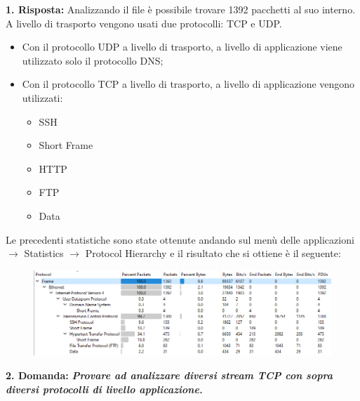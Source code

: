 \documentclass[a4paper]{article}
\begin{document}
	\noindent
	\textcolor{Green4}{\textbf{1. Risposta:}} Analizzando il file è possibile trovare 1392 pacchetti al suo interno. A livello di trasporto vengono usati due protocolli: TCP e UDP.
	\begin{itemize}
		\item Con il protocollo UDP a livello di trasporto, a livello di applicazione viene utilizzato solo il protocollo DNS;
		
		\item Con il protocollo TCP a livello di trasporto, a livello di applicazione vengono utilizzati:
		\begin{itemize}
			\item SSH
			\item Short Frame
			\item HTTP
			\item FTP
			\item Data
		\end{itemize}
	\end{itemize}
	Le precedenti statistiche sono state ottenute andando sul menù delle applicazioni $\rightarrow$ \textsf{Statistics} $\rightarrow$ \textsf{Protocol Hierarchy} e il risultato che si ottiene è il seguente:
	\begin{figure}[!htp]
		\centering
		\includegraphics[width=\textwidth]{img/wireshark/ex2-5.png}
	\end{figure}\newpage
	
	\noindent
	\textcolor{Red3}{\textbf{2. Domanda:}} \textbf{\emph{Provare ad analizzare diversi stream TCP con sopra diversi protocolli di livello applicazione.}}\newline
	
\end{document}
